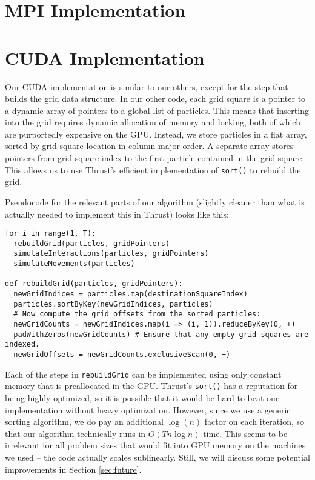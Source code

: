 \documentclass{article}
\newcommand{\code}[1]%
  {\texttt{#1}}
\begin{document}
\section{MPI Implementation}

\section{CUDA Implementation}
Our CUDA implementation is similar to our others, except for the step that builds the grid data structure.  In our other code, each grid square is a pointer to a dynamic array of pointers to a global list of particles.  This means that inserting into the grid requires dynamic allocation of memory and locking, both of which are purportedly expensive on the GPU.  Instead, we store particles in a flat array, sorted by grid square location in column-major order.  A separate array stores pointers from grid square index to the first particle contained in the grid square.  This allows us to use Thrust's efficient implementation of \code{sort()} to rebuild the grid.

Pseudocode for the relevant parts of our algorithm (slightly cleaner than what is actually needed to implement this in Thrust) looks like this:
\begin{verbatim}
for i in range(1, T):
  rebuildGrid(particles, gridPointers)
  simulateInteractions(particles, gridPointers)
  simulateMovements(particles)
  
def rebuildGrid(particles, gridPointers):
  newGridIndices = particles.map(destinationSquareIndex)
  particles.sortByKey(newGridIndices, particles)
  # Now compute the grid offsets from the sorted particles:
  newGridCounts = newGridIndices.map(i => (i, 1)).reduceByKey(0, +)
  padWithZeros(newGridCounts) # Ensure that any empty grid squares are indexed.
  newGridOffsets = newGridCounts.exclusiveScan(0, +)
\end{verbatim}

Each of the steps in \code{rebuildGrid} can be implemented using only constant memory that is preallocated in the GPU.  Thrust's \code{sort()} has a reputation for being highly optimized, so it is possible that it would be hard to beat our implementation without heavy optimization.  However, since we use a generic sorting algorithm, we do pay an additional $\log(n)$ factor on each iteration, so that our algorithm technically runs in $O(T n \log n)$ time.  This seems to be irrelevant for all problem sizes that would fit into GPU memory on the machines we used -- the code actually scales sublinearly.  Still, we will discuss some potential improvements in Section \ref{sec:future}.
\end{document}
